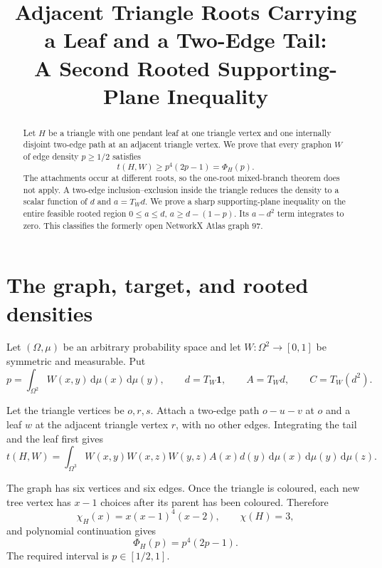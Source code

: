 \documentclass[11pt]{article}
\title{Adjacent Triangle Roots Carrying a Leaf and a Two-Edge Tail:\\
A Second Rooted Supporting-Plane Inequality}
\author{}
\date{}
\newcommand{\dd}{\,\mathrm d}
\begin{document}
\maketitle

\begin{abstract}
Let $H$ be a triangle with one pendant leaf at one triangle vertex and one
internally disjoint two-edge path at an adjacent triangle vertex.  We prove
that every graphon $W$ of edge density $p\geq1/2$ satisfies
\[
 t(H,W)\geq p^4(2p-1)=\Phi_H(p).
\]
The attachments occur at different roots, so the one-root mixed-branch
theorem does not apply.  A two-edge inclusion--exclusion inside the triangle
reduces the density to a scalar function of
$d$ and $a=T_Wd$.  We prove a sharp supporting-plane inequality on the
entire feasible rooted region
$0\leq a\leq d$, $a\geq d-(1-p)$.  Its $a-d^2$ term integrates to zero.
This classifies the formerly open NetworkX Atlas graph $97$.
\end{abstract}


\section{The graph, target, and rooted densities}

Let $(\Omega,\mu)$ be an arbitrary probability space and let
$W\colon\Omega^2\to[0,1]$ be symmetric and measurable.  Put
\[
 p=\int_{\Omega^2}W(x,y)\dd\mu(x)\dd\mu(y),
 \qquad d=T_W\mathbf1,
 \qquad A=T_Wd,
 \qquad C=T_W(d^2).
\]

Let the triangle vertices be $o,r,s$.  Attach a two-edge path $o-u-v$ at
$o$ and a leaf $w$ at the adjacent triangle vertex $r$, with no other edges.
Integrating the tail and the leaf first gives
\begin{equation}
 t(H,W)=\int_{\Omega^3}
 W(x,y)W(x,z)W(y,z)A(x)d(y)
 \dd\mu(x)\dd\mu(y)\dd\mu(z).
 \label{eq:density}
\end{equation}

The graph has six vertices and six edges.  Once the triangle is coloured,
each new tree vertex has $x-1$ choices after its parent has been coloured.
Therefore
\[
 \chi_H(x)=x(x-1)^4(x-2),
 \qquad \chi(H)=3,
\]
and polynomial continuation gives
\begin{equation}
 \Phi_H(p)=p^4(2p-1).
 \label{eq:target}
\end{equation}
The required interval is $p\in[1/2,1]$.
\end{document}
